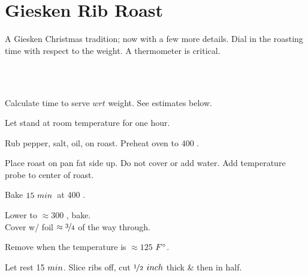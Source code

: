 \section[Rib Roast]{Giesken Rib Roast}


\begin{recipestats}[
	servings=\onehalf~\pound/person,
	preptime=1\onehalf~\hour,
	bakingtime=$\approx4~\hour$,
	inactivetime=1\onehalf~\hour,
	source=Giesken~Family,
]
\end{recipestats}


\begin{recipeabstract}
	A Giesken Christmas tradition; now with a few more details.
	Dial in the roasting time with respect to the weight.
	A thermometer is critical.
\end{recipeabstract}


\begin{ingredientcolumns}[1]
	\begin{ingredientblock}
		\\
		\\
	\end{ingredientblock}
\end{ingredientcolumns}


\begin{preparation}
\item Calculate time to serve $wrt$ weight.
	See estimates below.

\item Let stand at room temperature for one hour.

\item Rub pepper, salt, oil, on roast. Preheat oven to $400$ \Fahrenheit.

\item Place roast on pan fat side up.
	Do not cover or add water.
	Add temperature probe to center of roast.

\item Bake $15~\minute$~at 400 \Fahrenheit.

\item Lower to $\approx 300$ \Fahrenheit, bake.\\
	Cover w/ foil $\approx \threefourth$ of the way through.

\item Remove when the temperature is $\approx 125$ $\Fahrenheit$.

\item Let rest 15 $\minute$.
	Slice ribs off, cut $\onehalf$ $\inch$ thick \& then in half.

\end{preparation}


